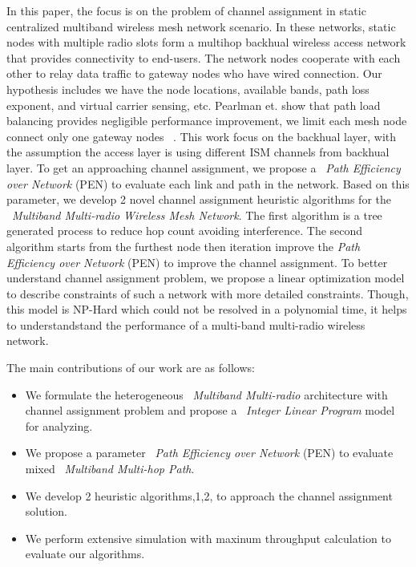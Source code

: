 In this paper, the focus is on the problem of channel assignment in static centralized multiband wireless mesh network scenario. 
In these networks, static nodes with multiple radio slots form a multihop backhual wireless access network that provides connectivity to end-users. The network nodes cooperate with each other to relay data traffic to gateway nodes who have wired connection. 
Our hypothesis includes we have the node locations, available bands, path loss exponent, and virtual carrier sensing, etc. 
Pearlman et. show that path load balancing provides negligible performance improvement, we limit each mesh node connect only one gateway nodes ~\cite{pearlman2000impact}.
This work focus on the backhual layer, with the assumption the access layer is using different ISM channels from backhual layer.
To get an approaching channel assignment, we propose a ~\emph{Path Efficiency over Network} (PEN) to evaluate each link and path in the network. Based on this parameter, we develop 2 novel channel assignment heuristic algorithms for the ~\emph{Multiband Multi-radio Wireless Mesh Network}. 
The first algorithm is a tree generated process to reduce hop count avoiding interference. The second algorithm starts from the furthest node then iteration improve the \emph{Path Efficiency over Network} (PEN) to improve the channel assignment.
To better understand channel assignment problem, we propose a linear optimization model to describe constraints of such a network with more detailed constraints. Though, this model is NP-Hard which could not be resolved in a polynomial time, it helps to understandstand the performance of a multi-band multi-radio wireless network. 

% 
The main contributions of our work are as follows:
\begin{itemize}
\item We formulate the heterogeneous ~\emph{Multiband Multi-radio} architecture with channel assignment problem and propose a ~\emph{Integer Linear Program} model for analyzing.  

\item We propose a  parameter ~\emph{Path Efficiency over Network} (PEN) to evaluate mixed ~\emph{Multiband Multi-hop Path}.

\item We develop 2 heuristic algorithms,1,2, to approach the channel assignment solution.

\item We perform extensive simulation with maxinum throughput calculation to evaluate our algorithms.


\end{itemize}

